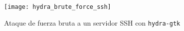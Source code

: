 \begin{figure}[h]
    \centering
    \texttt{[image: hydra\_brute\_force\_ssh]}
    \caption{Ataque de fuerza bruta a un servidor SSH con \texttt{hydra-gtk}}
\end{figure}








\clearpage
\printbibliography


